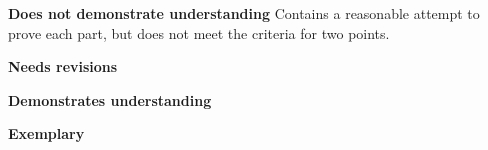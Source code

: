 \documentclass[letterpaper, 11pt]{../ximera}
\begin{document}
\begin{writeRubric}
    \item \textbf{Does not demonstrate understanding}
     Contains a reasonable attempt to prove each part, but does not meet the criteria for two points.
    \item \textbf{Needs revisions}
     
    \item \textbf{Demonstrates understanding}
    
    \item \textbf{Exemplary}
        
\end{writeRubric}
                                       
\end{document}
